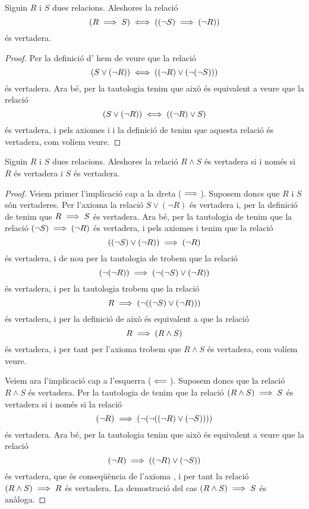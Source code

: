 \documentclass[../../Main.tex]{subfiles}
\begin{document}
	\begin{tautology}
		\label{taut:llei de les contrarecíproques}
		Siguin \(R\) i \(S\) dues relacions. Aleshores la relació
		\[(R\implies S)\iff((\lnot S)\implies(\lnot R))\]
		és vertadera.
		\begin{proof}
			Per la definició d' hem de veure que la relació
			\[(S\lor(\lnot R))\iff((\lnot R)\lor(\lnot(\lnot S)))\]
			és vertadera. Ara bé, per la tautologia  tenim que això és equivalent a veure que la relació
			\[(S\lor(\lnot R))\iff((\lnot R)\lor S)\]
			és vertadera, i pels axiomes  i  i la definició de  tenim que aquesta relació és vertadera, com volíem veure.
		\end{proof}
	\end{tautology}
	\begin{tautology}
		\label{taut:condició equivalent a conjunció}
		Siguin \(R\) i \(S\) dues relacions. Aleshores la relació \(R\land S\) és vertadera si i només si \(R\) és vertadera i \(S\) és vertadera.
		\begin{proof}
			Veiem primer l'implicació cap a la dreta (\(\implies\)). Suposem doncs que \(R\) i \(S\) són vertaderes. Per l'axioma  la relació \(S\lor(\lnot R)\) és vertadera i, per la definició de  tenim que \(R\implies S\) és vertadera. Ara bé, per la tautologia de  tenim que la relació \((\lnot S)\implies(\lnot R)\) és vertadera, i pels axiomes  i  tenim que la relació
			\[((\lnot S)\lor(\lnot R))\implies(\lnot R)\]
			és vertadera, i de nou per la tautologia de  trobem que la relació
			\[(\lnot(\lnot R))\implies(\lnot(\lnot S)\lor(\lnot R))\]
			és vertadera, i per la tautologia  trobem que la relació
			\[R\implies(\lnot((\lnot S)\lor(\lnot R)))\]
			és vertadera, i per la definició de  això és equivalent a que la relació
			\[R\implies(R\land S)\]
			és vertadera, i per tant per l'axioma  trobem que \(R\land S\) és vertadera, com volíem veure.
			
			Veiem ara l'implicació cap a l'esquerra (\(\impliedby\)). Suposem doncs que la relació \(R\land S\) és vertadera. Per la tautologia de  tenim que la relació \((R\land S)\implies S\) és vertadera si i només si la relació
			\[(\lnot R)\implies(\lnot(\lnot((\lnot R)\lor(\lnot S))))\]
			és vertadera. Ara bé, per la tautologia  tenim que això és equivalent a veure que la relació
			\[(\lnot R)\implies((\lnot R)\lor(\lnot S))\]
			és vertadera, que és conseqüència de l'axioma , i per tant la relació \((R\land S)\implies R\) és vertadera. La demostració del cas \((R\land S)\implies S\) és anàloga.
		\end{proof}
	\end{tautology}
\end{document}

